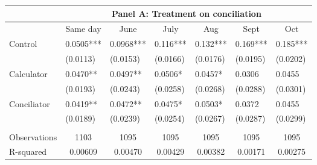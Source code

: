 \begin{tabular}{rrrrrrr}
\toprule
      & \multicolumn{6}{c}{Panel A: Treatment on conciliation} \\
\midrule
      & \multicolumn{1}{c}{Same day} & \multicolumn{1}{c}{June} & \multicolumn{1}{c}{July } & \multicolumn{1}{c}{Aug} & \multicolumn{1}{c}{Sept} & \multicolumn{1}{c}{Oct} \\
      \midrule
      \midrule
\multicolumn{1}{l}{Control} & \multicolumn{1}{l}{0.0505***} & \multicolumn{1}{l}{0.0968***} & \multicolumn{1}{l}{0.116***} & \multicolumn{1}{l}{0.132***} & \multicolumn{1}{l}{0.169***} & \multicolumn{1}{l}{0.185***} \\
\multicolumn{1}{l}{} & \multicolumn{1}{l}{(0.0113)} & \multicolumn{1}{l}{(0.0153)} & \multicolumn{1}{l}{(0.0166)} & \multicolumn{1}{l}{(0.0176)} & \multicolumn{1}{l}{(0.0195)} & \multicolumn{1}{l}{(0.0202)} \\
\multicolumn{1}{l}{Calculator} & \multicolumn{1}{l}{0.0470**} & \multicolumn{1}{l}{0.0497**} & \multicolumn{1}{l}{0.0506*} & \multicolumn{1}{l}{0.0457*} & \multicolumn{1}{l}{0.0306} & \multicolumn{1}{l}{0.0455} \\
\multicolumn{1}{l}{} & \multicolumn{1}{l}{(0.0193)} & \multicolumn{1}{l}{(0.0243)} & \multicolumn{1}{l}{(0.0258)} & \multicolumn{1}{l}{(0.0268)} & \multicolumn{1}{l}{(0.0288)} & \multicolumn{1}{l}{(0.0301)} \\
\multicolumn{1}{l}{Conciliator} & \multicolumn{1}{l}{0.0419**} & \multicolumn{1}{l}{0.0472**} & \multicolumn{1}{l}{0.0475*} & \multicolumn{1}{l}{0.0503*} & \multicolumn{1}{l}{0.0372} & \multicolumn{1}{l}{0.0455} \\
\multicolumn{1}{l}{} & \multicolumn{1}{l}{(0.0189)} & \multicolumn{1}{l}{(0.0239)} & \multicolumn{1}{l}{(0.0254)} & \multicolumn{1}{l}{(0.0267)} & \multicolumn{1}{l}{(0.0287)} & \multicolumn{1}{l}{(0.0299)} \\
\multicolumn{1}{l}{} &       &       &       &       &       &  \\
\midrule
\multicolumn{1}{l}{Observations} & \multicolumn{1}{c}{1103} & \multicolumn{1}{c}{1095} & \multicolumn{1}{c}{1095} & \multicolumn{1}{c}{1095} & \multicolumn{1}{c}{1095} & \multicolumn{1}{c}{1095} \\
\multicolumn{1}{l}{R-squared} & \multicolumn{1}{c}{0.00609} & \multicolumn{1}{c}{0.00470} & \multicolumn{1}{c}{0.00429} & \multicolumn{1}{c}{0.00382} & \multicolumn{1}{c}{0.00171} & \multicolumn{1}{c}{0.00275} \\

\end{tabular}
